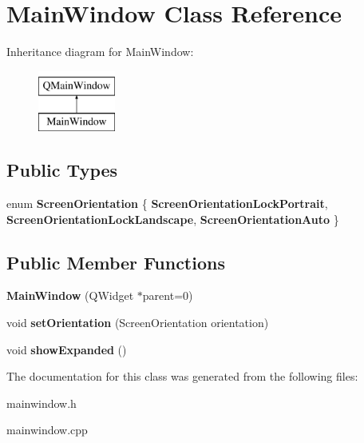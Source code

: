 \hypertarget{classMainWindow}{\section{Main\-Window Class Reference}
\label{classMainWindow}
}
Inheritance diagram for Main\-Window\-:\begin{figure}[H]
\begin{center}
\leavevmode
\includegraphics[height=2.000000cm]{classMainWindow}
\end{center}
\end{figure}
\subsection*{Public Types}
\begin{DoxyCompactItemize}
\item 
enum {\bfseries Screen\-Orientation} \{ {\bfseries Screen\-Orientation\-Lock\-Portrait}, 
{\bfseries Screen\-Orientation\-Lock\-Landscape}, 
{\bfseries Screen\-Orientation\-Auto}
 \}
\end{DoxyCompactItemize}
\subsection*{Public Member Functions}
\begin{DoxyCompactItemize}
\item 
\hypertarget{classMainWindow_a8b244be8b7b7db1b08de2a2acb9409db}{{\bfseries Main\-Window} (Q\-Widget $\ast$parent=0)}\label{classMainWindow_a8b244be8b7b7db1b08de2a2acb9409db}

\item 
\hypertarget{classMainWindow_a9597b97cef9da0760a06e8e04ca3d138}{void {\bfseries set\-Orientation} (Screen\-Orientation orientation)}\label{classMainWindow_a9597b97cef9da0760a06e8e04ca3d138}

\item 
\hypertarget{classMainWindow_ae66038a9d909fd409d781bf7c3f3ff2c}{void {\bfseries show\-Expanded} ()}\label{classMainWindow_ae66038a9d909fd409d781bf7c3f3ff2c}

\end{DoxyCompactItemize}


The documentation for this class was generated from the following files\-:\begin{DoxyCompactItemize}
\item 
mainwindow.\-h\item 
mainwindow.\-cpp\end{DoxyCompactItemize}

